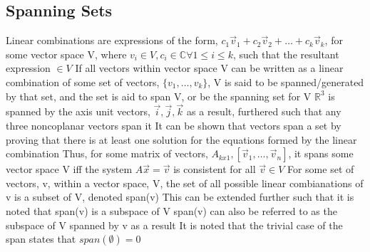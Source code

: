 \documentclass[11 pt, twoside]{article}
\newenvironment{outline*}
{
	\begin{outline}[enumerate]
	}
	{\end{outline}
}
\begin{document}
\subsection{Spanning Sets}
\begin{outline*}
\1 Linear combinations are expressions of the form, $c_1\vec{v}_1 + c_2\vec{v}_2 + \dots + c_k\vec{v}_k$, for some vector space V, where $v_i \in V, c_i \in \mathbb{C} \forall 1 \leq i \leq k$, such that the resultant expression $\in V$
\2 If all vectors within vector space V can be written as a linear combination of some set of vectors, $\{v_1, \dots, v_k\}$, V is said to be spanned/generated by that set, and the set is aid to span V, or be the spanning set for V
\2 $\mathbb{R}^3$ is spanned by the axis unit vectors, $\vec{i}, \vec{j}, \vec{k}$ as a result, furthered such that any three noncoplanar vectors span it
\2 It can be shown that vectors span a set by proving that there is at least one solution for the equations formed by the linear combination
\3 Thus, for some matrix of vectors, $A_{kx1}, [\vec{v}_1, \dots, \vec{v}_n]$, it spans some vector space V iff the system $A\vec{x} = \vec{v}$ is consistent for all $\vec{v} \in V$
\1 For some set of vectors, v, within a vector space, V, the set of all possible linear combianations of v is a subset of V, denoted span(v)
\2 This can be extended further such that it is noted that span(v) is a subspace of V
\2 span(v) can also be referred to as the subspace of V spanned by v as a result
\2 It is noted that the trivial case of the span states that $span(\emptyset) = {0}$
\end{outline*}
\end{document}
